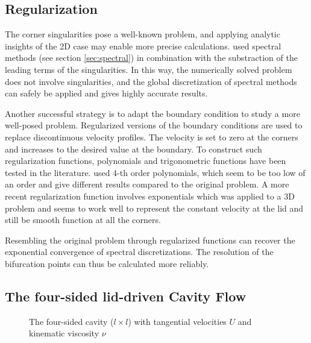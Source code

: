 \subsection{Regularization} \label{sec:regul}

The corner singularities pose a well-known problem, and applying analytic
insights of the 2D case may enable more precise calculations.
\cite{botella1998} used spectral methods (see section \ref{sec:spectral}) in
combination with the substraction of the leading terms of the singularities. In
this way, the numerically solved problem does not involve singularities, and
the global discretization of spectral methods can safely be applied and gives
highly accurate results. 

Another successful strategy is to adapt the boundary condition to study a more
well-posed problem. Regularized versions of the boundary conditions are used to
replace discontinuous velocity profiles. The velocity is set to zero at the
corners and increases to the desired value at the boundary. To construct such
regularization functions, polynomials \citep{shen1991} and trigonometric
functions have been tested in the literature. \cite{shen1991} used 4-th order
polynomials, which seem to be too low of an order and give different results
compared to the original problem. A more recent regularization function
involves exponentials \citep{lopez2017} which was applied to a 3D problem and
seems to work well to represent the constant velocity at the lid and still be
smooth function at all the corners.

Resembling the original problem through regularized functions can recover the
exponential convergence of spectral discretizations. The resolution of the
bifurcation points can thus be calculated more reliably.  

\subsection{The four-sided lid-driven Cavity Flow} \label{sec:4sc}

\begin{figure}[ht]
\centering
{}
\caption{The four-sided cavity ($l \times l$) with tangential velocities $U$ and
  kinematic viscosity $\nu$ }
\label{fig:cav_4s}
\end{figure}

